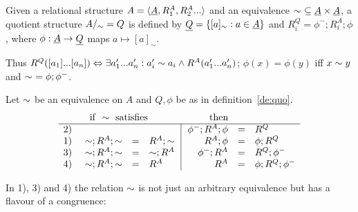 \documentclass[10pt]{article}
\begin{document}
\begin{Definition}
\label{de:quo}
Given a relational structure $A=\langle\underline {A},R_1^A,R_2^A...\rangle$ and an equivalence
 $\sim\ \subseteq \underline {A}\times\underline {A}$, a
quotient structure $A/_{\sim} = Q$ is defined by
$\underline {Q} = \{[a]_\sim : a\in\underline {A}\}$ and $R_i^Q = \phi^-;R_i^A;\phi$,
where $\phi:\underline {A}\rightarrow \underline {Q}$ maps $a\mapsto [a]_\sim$.
\end{Definition}
%
Thus $R^Q([a_{1}]...[a_{n}]) \Leftrightarrow \exists a'_{1}...a'_{n}:
 a'_i\sim a_i\land R^A(a'_{1}...a'_{n})$;
$\phi(x)=\phi(y)$ iff $x\sim y$ and
 $\sim\ = \phi;\phi^-$.

\begin{Prop}
\label{pro:cong}\label{le:canonichom}
Let $\sim$ be an equivalence on $A$ and $Q,\phi$ be
as in definition~\ref{de:quo}.
\[
\begin{array}{r@{\ \ \ \ }rcl@{\ \ }|@{\ \ }rcl}
& \multicolumn{3}{l}{{\rm if\ }\congo\ {\rm satisfies}} & \multicolumn{2}{c}{{\rm then}} \\ \hline
2) &   & &                               & \phi^-;R^A;\phi &=& R^Q \\
1) & \congo;R^A;\congo & = & R^A;\congo  & R^A;\phi &=& \phi;R^Q \\
3) & \congo;R^A;\congo & = & \congo;R^A  & \phi^-;R^A &=& R^Q;\phi^- \\
4) & \congo;R^A;\congo & = & R^A         & R^A &=& \phi;R^Q;\phi^-
\end{array}
\]
\end{Prop}

\noindent
In 1), 3) and 4) the relation $\sim$ is not just an arbitrary
equivalence but has a flavour of a congruence:
\end{document}
